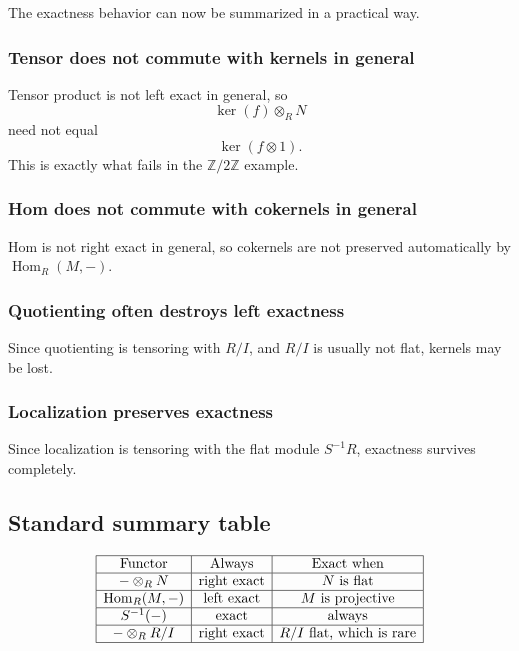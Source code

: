 \documentclass[12pt,a4paper]{article}
\theoremstyle{notespace}
\theoremstyle{definition}
\begin{document}
The exactness behavior can now be summarized in a practical way.

\subsubsection*{Tensor does not commute with kernels in general}

Tensor product is not left exact in general, so
\[
\ker(f)\otimes_R N
\]
need not equal
\[
\ker(f\otimes 1).
\]
This is exactly what fails in the \(\mathbb Z/2\mathbb Z\) example.

\subsubsection*{Hom does not commute with cokernels in general}

Hom is not right exact in general, so cokernels are not preserved automatically by \(\operatorname{Hom}_R(M,-)\).

\subsubsection*{Quotienting often destroys left exactness}

Since quotienting is tensoring with \(R/I\), and \(R/I\) is usually not flat, kernels may be lost.

\subsubsection*{Localization preserves exactness}

Since localization is tensoring with the flat module \(S^{-1}R\), exactness survives completely.

\subsection{ Standard summary table}

\[
\begin{array}{|c|c|c|}
	\hline
	\text{Functor} & \text{Always} & \text{Exact when} \\
	\hline
	-\otimes_R N & \text{right exact} & N \text{ is flat} \\
	\hline
	\operatorname{Hom}_R(M,-) & \text{left exact} & M \text{ is projective} \\
	\hline
	S^{-1}(-) & \text{exact} & \text{always} \\
	\hline
	-\otimes_R R/I & \text{right exact} & R/I \text{ flat, which is rare} \\
	\hline
\end{array}
\]
\end{document}
